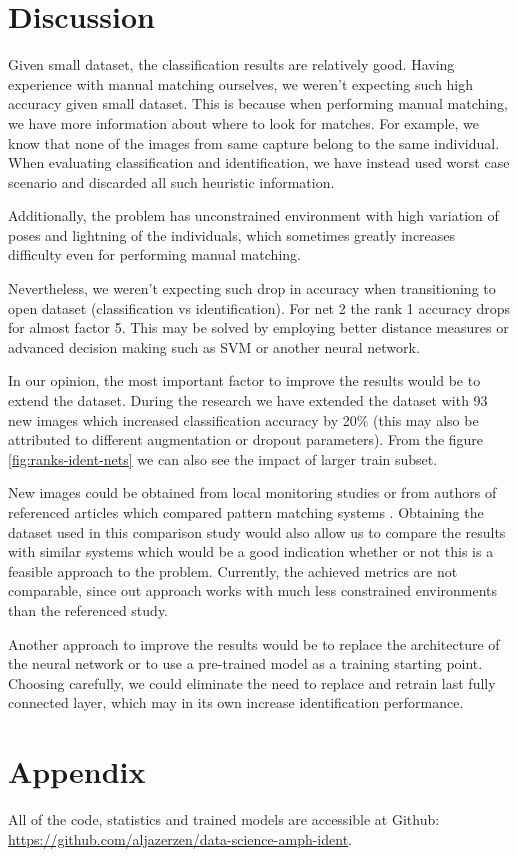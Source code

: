 \documentclass[fleqn,moreauthors,10pt]{ds_report}
\begin{document}
\section*{Discussion}

Given small dataset, the classification results are relatively good. Having experience with manual matching ourselves, we weren't expecting such high accuracy given small dataset. This is because when performing manual matching, we have more information about where to look for matches. For example, we know that none of the images from same capture belong to the same individual. When evaluating classification and identification, we have instead used worst case scenario and discarded all such heuristic information.

Additionally, the problem has unconstrained environment with high variation of poses and lightning of the individuals, which sometimes greatly increases difficulty even for performing manual matching.

Nevertheless, we weren't expecting such drop in accuracy when transitioning to open dataset (classification vs identification). For net 2 the rank 1 accuracy drops for almost factor 5. This may be solved by employing better distance measures or advanced decision making such as SVM or another neural network.

In our opinion, the most important factor to improve the results would be to extend the dataset. During the research we have extended the dataset with 93 new images which increased classification accuracy by 20\% (this may also be attributed to different augmentation or dropout parameters). From the figure \ref{fig:ranks-ident-nets} we can also see the impact of larger train subset. 

New images could be obtained from local monitoring studies or from authors of referenced articles which compared pattern matching systems \cite{ident_comparison}. Obtaining the dataset used in this comparison study would also allow us to compare the results with similar systems which would be a good indication whether or not this is a feasible approach to the problem. Currently, the achieved metrics are not comparable, since out approach works with much less constrained environments than the referenced study.

Another approach to improve the results would be to replace the architecture of the neural network or to use a pre-trained model as a training starting point. Choosing carefully, we could eliminate the need to replace and retrain last fully connected layer, which may in its own increase identification performance.

\section*{Appendix}

All of the code, statistics and trained models are accessible at Github: \url{https://github.com/aljazerzen/data-science-amph-ident}.



\end{document}
